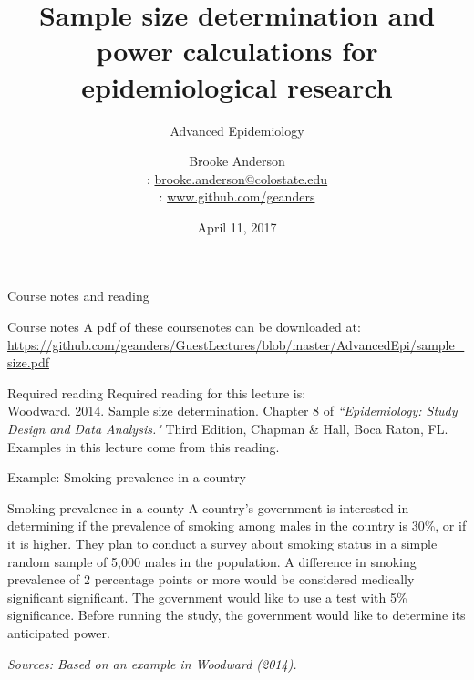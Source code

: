 \documentclass[ignorenonframetext,]{beamer}
\title[Sample size determination / Power calculations]{Sample size determination and power calculations for epidemiological research}
\subtitle{Advanced Epidemiology}
\date{April 11, 2017}
\author[Brooke Anderson]{
  Brooke Anderson \\\medskip
  {\small \faEnvelope: \url{brooke.anderson@colostate.edu}} \\
  {\small \faGithub:  \url{www.github.com/geanders}}}
\institute[Colorado State University]{
  Department of Environmental \& Radiological Health Sciences \\
  Environmental Epidemiology Section \\
  Colorado State University}
\date{}
\begin{document}
\begin{frame}
  \titlepage
\end{frame}

\begin{frame}{Course notes and reading}

\begin{block}{Course notes}
A pdf of these coursenotes can be downloaded at: \\ \medskip
\url{https://github.com/geanders/GuestLectures/blob/master/AdvancedEpi/sample_size.pdf}
\end{block}

\begin{block}{Required reading}
Required reading for this lecture is: \\ \medskip
Woodward. 2014. Sample size determination. Chapter 8 of \textit{``Epidemiology: Study Design and Data Analysis."} Third Edition, Chapman \& Hall, Boca Raton, FL. \\ \medskip
Examples in this lecture come from this reading. 
\end{block}

\end{frame}

\begin{frame}{Example: Smoking prevalence in a country}

\begin{block}{Smoking prevalence in a county}
A country's government is interested in determining if the prevalence of smoking among males in the country is 30\%, or if it is higher. They plan to conduct a survey about smoking status in a simple random sample of 5,000 males in the population. A difference in smoking prevalence of 2 percentage points or more would be considered medically significant significant. The government would like to use a test with 5\% significance. Before running the study, the government would like to determine its anticipated power.
\end{block}

\footnotesize{\textit{Sources: Based on an example in Woodward (2014).}}

\end{frame}
\end{document}
